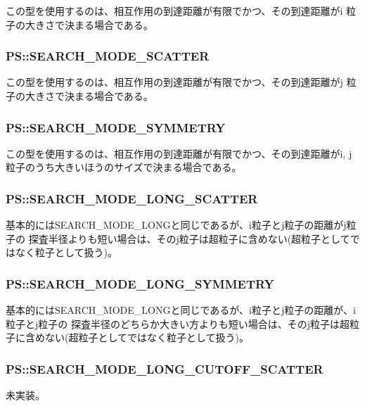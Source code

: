 この型を使用するのは、相互作用の到達距離が有限でかつ、その到達距離がi
粒子の大きさで決まる場合である。

\subsubsection{PS::SEARCH\_MODE\_SCATTER}

この型を使用するのは、相互作用の到達距離が有限でかつ、その到達距離がj
粒子の大きさで決まる場合である。

\subsubsection{PS::SEARCH\_MODE\_SYMMETRY}

この型を使用するのは、相互作用の到達距離が有限でかつ、その到達距離がi,
j粒子のうち大きいほうのサイズで決まる場合である。

\subsubsection{PS::SEARCH\_MODE\_LONG\_SCATTER}

基本的にはSEARCH\_MODE\_LONGと同じであるが、i粒子とj粒子の距離がj粒子の
探査半径よりも短い場合は、そのj粒子は超粒子に含めない(超粒子としてではなく粒子として扱う)。

\subsubsection{PS::SEARCH\_MODE\_LONG\_SYMMETRY}

基本的にはSEARCH\_MODE\_LONGと同じであるが、i粒子とj粒子の距離が、i粒子とj粒子の
探査半径のどちらか大きい方よりも短い場合は、そのj粒子は超粒子に含めない(超粒子としてではなく粒子として扱う)。


\subsubsection{PS::SEARCH\_MODE\_LONG\_CUTOFF\_SCATTER}

未実装。
